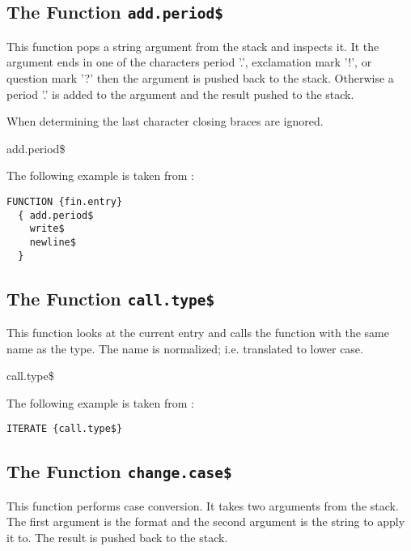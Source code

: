 \subsection{The Function \texttt{add.period\$}}%

This function pops a string argument from the stack and inspects it.
It the argument ends in one of the characters period '.', exclamation
mark '!', or question mark '?' then the argument is pushed back to the
stack. Otherwise a period '.' is added to the argument and the result
pushed to the stack.

When determining the last character closing braces are ignored.

\begin{BstFunction}{add.period\$}
\end{BstFunction}

The following example is taken from :

\begin{lstlisting}[language=bst]
  FUNCTION {fin.entry}
  { add.period$
    write$
    newline$
  }
\end{lstlisting}


\subsection{The Function \texttt{call.type\$}}%

This function looks at the current entry and calls the function
with the same name as the type. The name is normalized; i.e.
translated to lower case.

\begin{BstFunction}{call.type\$}
\end{BstFunction}

The following example is taken from :

\begin{lstlisting}[language=bst]
  ITERATE {call.type$}
\end{lstlisting}


\subsection{The Function \texttt{change.case\$}}%

This function performs case conversion. It takes two arguments from
the stack. The first argument is the format and the second argument is
the string to apply it to. The result is pushed back to the stack.

